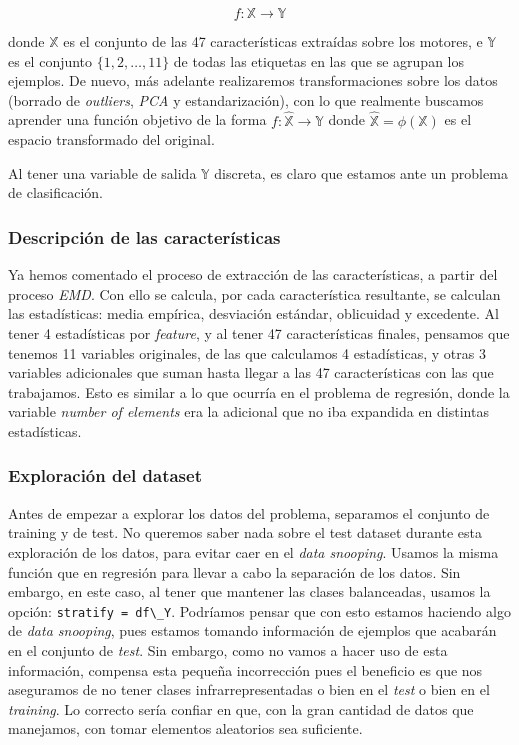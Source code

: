 \documentclass[11pt]{article}
\begin{document}
$$f: \mathbb{X} \rightarrow \mathbb{Y}$$

donde $\mathbb{X}$ es el conjunto de las 47 características extraídas sobre los motores, e $\mathbb{Y}$ es el conjunto $\{1, 2, \ldots, 11\}$ de todas las etiquetas en las que se agrupan los ejemplos. De nuevo, más adelante realizaremos transformaciones sobre los datos (borrado de \emph{outliers}, \emph{PCA} y estandarización), con lo que realmente buscamos aprender una función objetivo de la forma $f: \hat{\mathbb{X}} \rightarrow \mathbb{Y}$ donde $\hat{\mathbb{X}} = \phi(\mathbb{X})$ es el espacio transformado del original.

Al tener una variable de salida $\mathbb{Y}$ discreta, es claro que estamos ante un problema de clasificación.

\subsubsection{Descripción de las características}

Ya hemos comentado el proceso de extracción de las características, a partir del proceso \emph{EMD}. Con ello se calcula, por cada característica resultante, se calculan las estadísticas: media empírica, desviación estándar, oblicuidad y excedente. Al tener 4 estadísticas por \emph{feature}, y al tener 47 características finales, pensamos que tenemos 11 variables originales, de las que calculamos 4 estadísticas, y otras 3 variables adicionales que suman hasta llegar a las 47 características con las que trabajamos. Esto es similar a lo que ocurría en el problema de regresión, donde la variable \emph{number of elements} era la adicional que no iba expandida en distintas estadísticas.

\subsubsection{Exploración del dataset}

Antes de empezar a explorar los datos del problema, separamos el conjunto de training y de test. No queremos saber nada sobre el test dataset durante esta exploración de los datos, para evitar caer en el \emph{data snooping}. Usamos la misma función que en regresión para llevar a cabo la separación de los datos. Sin embargo, en este caso, al tener que mantener las clases balanceadas, usamos la opción: \lstinline{stratify = df\_Y}. Podríamos pensar que con esto estamos haciendo algo de \emph{data snooping}, pues estamos tomando información de ejemplos que acabarán en el conjunto de \emph{test}. Sin embargo, como no vamos a hacer uso de esta información, compensa esta pequeña incorrección pues el beneficio es que nos aseguramos de no tener clases infrarrepresentadas o bien en el \emph{test} o bien en el \emph{training}. Lo correcto sería confiar en que, con la gran cantidad de datos que manejamos, con tomar elementos aleatorios sea suficiente.
\end{document}
